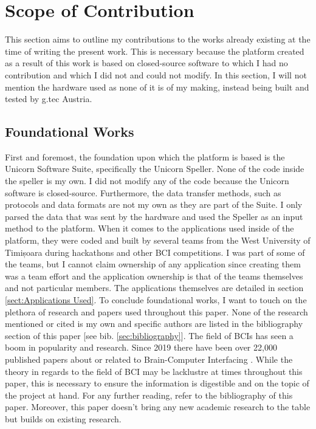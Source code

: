 \section{Scope of Contribution}\label{sect:Scope of Contribution}

This section aims to outline my contributions to the works already existing at the time of writing the present work. This is necessary because the platform created as a result of this work is based on closed-source software to which I had no contribution and which I did not and could not modify. In this section, I will not mention the hardware used as none of it is of my making, instead being built and tested by g.tec Austria.


\subsection{Foundational Works}
First and foremost, the foundation upon which the platform is based is the Unicorn Software Suite, specifically the Unicorn Speller. None of the code inside the speller is my own. I did not modify any of the code because the Unicorn software is closed-source. Furthermore, the data transfer methods, such as protocols and data formats are not my own as they are part of the Suite. I only parsed the data that was sent by the hardware and used the Speller as an input method to the platform.
\vspace{\baselineskip}\newline
When it comes to the applications used inside of the platform, they were coded and built by several teams from the West University of Timișoara during hackathons and other BCI competitions. I was part of some of the teams, but I cannot claim ownership of any application since creating them was a team effort and the application ownership is that of the teams themselves and not particular members. The applications themselves are detailed in section \ref{sect:Applications Used}.
\vspace{\baselineskip}\newline
To conclude foundational works, I want to touch on the plethora of research and papers used throughout this paper. None of the research mentioned or cited is my own and specific authors are listed in the bibliography section of this paper [see bib. \ref{sec:bibliography}]. The field of BCIs has seen a boom in popularity and research. Since 2019 there have been over 22,000 published papers about or related to Brain-Computer Interfacing \cite{bci_scholarly_articles}. While the theory in regards to the field of BCI may be lacklustre at times throughout this paper, this is necessary to ensure the information is digestible and on the topic of the project at hand. For any further reading, refer to the bibliography of this paper. Moreover, this paper doesn't bring any new academic research to the table but builds on existing research.


